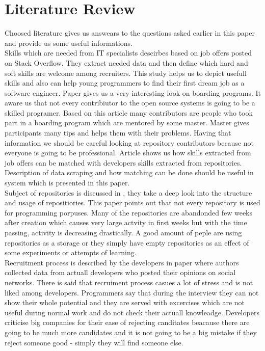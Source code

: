 \documentclass[graybox]{svmult}
\begin{document}
\section{Literature Review}
Choosed literature gives us answears to the questions asked earlier in this paper and provide us some useful informations. \\Skills which are needed from IT specialists descirbes \cite{StackOverflowStudies} based on job offers posted on Stack Overflow. They extract needed data and then define which hard and soft skills are welcome among recruiters. This study helps us to depict usefull skills and also can help young programmers to find their first dream job as a software engineer. Paper \cite{DoOnBoardingProgramsWork} gives us a very interesting look on boarding programs. It aware us that not every contribiutor to the open source systems is going to be a skilled programer. Based on this article many contributors are people who took part in a boarding program which are mentored by some master. Master gives participants many tips and helps them with their problems. Having that information we should be careful looking at repository contributors because not everyone is going to be professional. Article \cite{GitHubProfilesToJobAdv} shows us how skills extracted from job offers can be matched with developers skills extracted from repositories. Description of data scraping and how matching can be done should be useful in system which is presented in this paper.
\\Subject of repositories is discussed in \cite{MiningGitHub}, they take a deep look into the structure and usage of repositiories. This paper points out that not every repository is used for programming porpuses. Many of the repositories are abandonded few weeks after creation which causes very large actvity in first weeks but with the time passing, activity is decreasing drastically. A good amount of peple are using repositories as a storage or they simply have empty repositories as an effect of some experiments or attempts of learning. 
\\Recruitment process is described by the developers in paper \cite{HiringIsBroken} where authors collected data from actuall developers who posted their opinions on social networks. There is said that recruiment process casues a lot of stress and is not liked among developers. Programmers say that during the interview they can not show their whole potential and they are served with excercises which are not useful during normal work and do not check their actuall knowleadge. Developers criticise big companies for their ease of rejecting canditates beacause there are going to be much more candidates and it is not going to be a big mistake if they reject someone good - simply they will find someone else.
\end{document}
